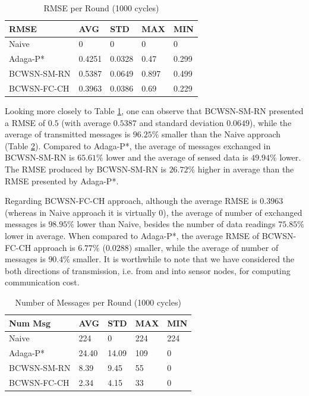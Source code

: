 \documentclass[conference]{IEEEtran}
\begin{document}
\begin{table}[h!]
\caption{RMSE per Round (1000 cycles)}
\label{tab:rmse}
\begin{center}
\begin{tabular}{|l||l|l|l|l|}
\hline
RMSE &AVG &STD &MAX &MIN \\
\hline\hline
Naive &0 &0 &0 &0 \\
\hline
Adaga-P* &0.4251 &0.0328 &0.47 &0.299 \\
\hline
BCWSN-SM-RN &0.5387 &0.0649 &0.897 &0.499 \\
\hline
BCWSN-FC-CH &0.3963 &0.0386 &0.69 &0.229 \\
\hline
\end{tabular}
\end{center}
\end{table}


Looking more closely to Table \ref{tab:rmse}, one can observe that BCWSN-SM-RN
presented a RMSE of $0.5$ (with average $0.5387$ and standard deviation $0.0649$),
while the average of transmitted messages is $96.25\%$ smaller than the Naive
approach (Table \ref{tab:num-msg}). Compared to Adaga-P*, the average of
messages exchanged in BCWSN-SM-RN is $65.61\%$ lower and the average of sensed
data is $49.94\%$ lower. The RMSE produced by BCWSN-SM-RN is $26.72\%$ higher in
average than the RMSE presented by Adaga-P*.

Regarding BCWSN-FC-CH approach, although the average RMSE is $0.3963$ (whereas
in Naive approach it is virtually $0$), the average of number of exchanged
messages is $98.95\%$ lower than Naive, besides the number of data readings
$75.85\%$ lower in average. When compared to Adaga-P*, the average RMSE of
BCWSN-FC-CH approach is $6.77\%$ ($0.0288$) smaller, while the average of number
of messages is $90.4\%$ smaller. It is worthwhile to note that we have
considered the both directions of transmission, i.e. from and into sensor nodes,
for computing communication cost.



\begin{table}[h!]
\caption{Number of Messages per Round (1000 cycles)}
\label{tab:num-msg}
\begin{center}
\begin{tabular}{|l||l|l|l|l|}
\hline
Num Msg &AVG &STD &MAX &MIN \\
\hline\hline
Naive &224 &0 &224 &224 \\
\hline
Adaga-P* &24.40 &14.09 &109 &0 \\
\hline
BCWSN-SM-RN &8.39 &9.45 &55 &0 \\
\hline
BCWSN-FC-CH &2.34 &4.15 &33 &0 \\
\hline
\end{tabular}
\end{center}
\end{table}
\end{document}
